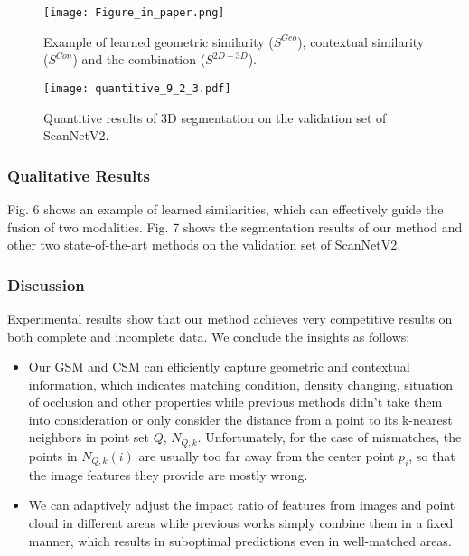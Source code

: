 \documentclass[letterpaper, 10 pt, conference]{ieeeconf}
\begin{document}
\begin{figure}[t]
\centering
\texttt{[image: Figure\_in\_paper.png]}
\vspace{-3mm}
\caption{Example of learned geometric similarity ($S^{Geo}$), contextual similarity ($S^{Con}$) and the combination ($S^{2D-3D}$).}
\vspace{-3mm}
\end{figure}

\begin{figure}[t]
\centering
\texttt{[image: quantitive\_9\_2\_3.pdf]}
\vspace{-4mm}
\caption{Quantitive results of 3D segmentation on the validation set of ScanNetV2.}
\vspace{-7mm}
\end{figure}

\subsubsection{\textbf{Qualitative Results}}
Fig. 6 shows an example of learned similarities, which can effectively guide the fusion of two modalities.
Fig. 7 shows the segmentation results of our method and other two state-of-the-art methods on the validation set of ScanNetV2.


\subsubsection{\textbf{Discussion}}
Experimental results show that our method achieves very competitive results on both complete and incomplete data. We conclude the insights as follows:
\begin{itemize}

\item Our GSM and CSM can efficiently capture geometric and contextual information, which indicates matching condition, density changing, situation of occlusion and other properties while previous methods didn't take them into consideration or only consider the distance from a point to its k-nearest neighbors in point set $Q$, $N_{Q,k}$. Unfortunately, for the case of mismatches, the points in $N_{Q,k}(i)$ are usually too far away from the center point $p_i$, so that the image features they provide are mostly wrong. 
\item We can adaptively adjust the impact ratio of features from images and point cloud in different areas while previous works simply combine them in a fixed manner, which results in suboptimal predictions even in well-matched areas.

\end{itemize}
\end{document}
